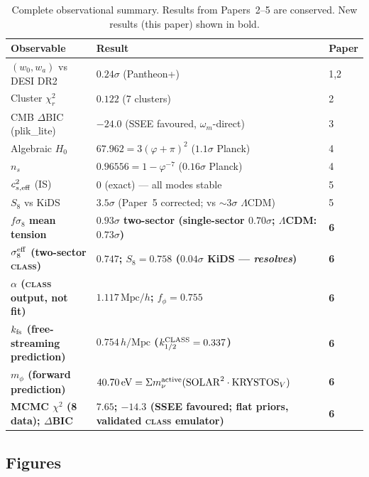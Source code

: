 \documentclass[12pt,a4paper]{article}
\newcommand{\kfs}{k_{\rm fs}}
\newcommand{\mnu}{\Sigma m_\nu}
\newcommand{\fsig}{f\sigma_8}
\newcommand{\sigeff}{\sigma_8^{\rm eff}}
\begin{document}
\begin{table}[htbp]
  \centering
  \caption{Complete observational summary. Results from Papers~2--5 are conserved.
    New results (this paper) shown in bold.}
  \label{tab:summary}
  \begin{tabularx}{\textwidth}{l X X}
    \toprule
    Observable & Result & Paper \\
    \midrule
    $(w_0, w_a)$ vs DESI DR2 & $0.24\sigma$ (Pantheon+) & 1,2 \\
    Cluster $\chi^2_r$ & $0.122$ (7 clusters) & 2 \\
    CMB $\Delta\mathrm{BIC}$ (plik\_lite) & $-24.0$ (SSEE favoured, $\omega_m$-direct) & 3 \\
    Algebraic $H_0$ & $67.962 = 3(\varphi+\pi)^2$ ($1.1\sigma$ Planck) & 4 \\
    $n_s$ & $0.96556 = 1 - \varphi^{-7}$ ($0.16\sigma$ Planck) & 4 \\
    $c^2_{s,\rm eff}$ (IS) & $0$ (exact) — all modes stable & 5 \\
    $S_8$ vs KiDS & $3.5\sigma$ (Paper~5 corrected; vs $\sim3\sigma$ $\Lambda$CDM) & 5 \\
    \midrule
    \textbf{$\fsig$ mean tension} & \textbf{$0.93\sigma$ two-sector (single-sector $0.70\sigma$; $\Lambda$CDM: $0.73\sigma$)} & \textbf{6} \\
    \textbf{$\sigeff$ (two-sector \textsc{class})} & \textbf{$0.747$; $S_8=0.758$ ($0.04\sigma$ KiDS --- \emph{resolves})} & \textbf{6} \\
    \textbf{$\alpha$ (\textsc{class} output, not fit)} & \textbf{$1.117\,\mathrm{Mpc}/h$; $f_\phi=0.755$} & \textbf{6} \\
    \textbf{$\kfs$ (free-streaming prediction)} & \textbf{$0.754\,h/\mathrm{Mpc}$ ($k_{1/2}^{\rm CLASS}=0.337$)} & \textbf{6} \\
    \textbf{$m_\phi$ (forward prediction)} & \textbf{$40.70\,\mathrm{eV} = \mnu^{\rm active}(\mathrm{SOLAR}^2\cdot\mathrm{KRYSTOS}_V)$} & \textbf{6} \\
    \textbf{MCMC $\chi^2$ (8 data); $\Delta$BIC} & \textbf{$7.65$; $-14.3$ (SSEE favoured; flat priors, validated \textsc{class} emulator)} & \textbf{6} \\
    \bottomrule
  \end{tabularx}
\end{table}

\subsection{Figures}
\label{subsec:figures}
\end{document}

